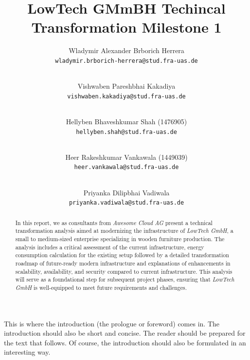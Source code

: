 \documentclass{llncs}
\newcommand{\what}{LowTech GMmBH Techincal Transformation Milestone 1}
\begin{document}
%
%
%
\mainmatter              %
%
\title{\what}
%
\author{
  Wladymir Alexander Brborich Herrera\\
  \texttt{wladymir.brborich-herrera@stud.fra-uas.de}
  \and\\ 
  Vishwaben Pareshbhai Kakadiya\\
  \texttt{vishwaben.kakadiya@stud.fra-uas.de}
  \and\\
  Hellyben Bhaveshkumar Shah (1476905)\\
  \texttt{hellyben.shah@stud.fra-uas.de}
  \and\\
  Heer Rakeshkumar Vankawala (1449039)\\
  \texttt{heer.vankawala@stud.fra-uas.de}
  \and\\
  Priyanka Dilipbhai Vadiwala\\
  \texttt{priyanka.vadiwala@stud.fra-uas.de}
}
%

\maketitle              %

\begin{abstract}
  In this report, we as consultants from \textit{Awesome Cloud AG} present a technical transformation analysis aimed at modernizing the infrastructure of \textit{LowTech GmbH}, 
  a small to medium-sized enterprise specializing in wooden furniture production. 
  The analysis includes a critical assessment of the current infrastructure, energy consumption calculation for the existing setup 
  followed by a detailed transformation roadmap of future-ready modern infrastructure and explanations of enhancements in scalability, availability, and security compared to current infrastructure. 
  This analysis will serve as a foundational step for subsequent project phases, ensuring that \textit{LowTech GmbH} is well-equipped to meet future requirements and challenges.
\end{abstract}

This is where the introduction (the prologue or foreword) comes in. The introduction should also be short and concise. The reader should be prepared for the text that follows. Of course, the introduction should also be formulated in an interesting way.
\end{document}
